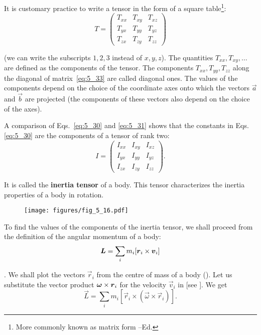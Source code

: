 It is customary practice to write a tensor in the form of a square table\footnote{More commonly known as matrix form --Ed.}:
\begin{equation}\label{eq:5_33}
	T = \begin{pmatrix}
		T_{xx}&T_{xy}&T_{xz}\\
		T_{yx}&T_{yy}&T_{yz}\\
		T_{zx}&T_{zy}&T_{zz}
		\end{pmatrix}
\end{equation}

\noindent
(we can write the subscripts $1, 2, 3$ instead of $x, y, z$). The quantities $T_{xx}, T_{xy}, \ldots$ are defined as the components of the tensor. The components $T_{xx}, T_{yy}, T_{zz}$ along the diagonal of matrix~\eqref{eq:5_33} are called diagonal ones. The values of the components depend on the choice of the coordinate axes onto which the vectors $\vec{a}$ and $\vec{b}$ are projected (the components of these vectors also depend on the choice of the axes).

A comparison of Eqs.~\eqref{eq:5_30} and \eqref{eq:5_31} shows that the constants in Eqs.\eqref{eq:5_30} are the components of a tensor of rank two:
\begin{equation}\label{eq:5_34}
	I = \begin{pmatrix}
		I_{xx}&I_{xy}&I_{xz}\\
		I_{yx}&I_{yy}&I_{yz}\\
		I_{zx}&I_{zy}&I_{zz}
	\end{pmatrix}.
\end{equation}

\noindent
It is called the \textbf{inertia tensor} of a body. This tensor characterizes the inertia properties of a body in rotation.

\begin{figure}[t]
	\begin{center}
		\texttt{[image: figures/fig\_5\_16.pdf]}
		\caption[]{}
		\label{fig:5_16}
	\end{center}
\vspace{-1.0cm}
\end{figure}

To find the values of the components of the inertia tensor, we shall proceed from the definition of the angular momentum of a body:
\begin{equation}\label{eq:5_35}
\boldsymbol{L} = \sum_i m_i [\boldsymbol{r}_{i}\times\boldsymbol{v}_{i}]
\end{equation}

. We shall plot the vectors $\vec{r}_i$ from the centre of mass of a body (). Let us substitute the vector product $\boldsymbol{\omega}\times\boldsymbol{r}_i$ for the velocity $\vec{v}_i$ in  [see ]. We get
\begin{equation*}
\vec{L} = \sum_i m_i [\vec{r}_i \times (\vec{\omega} \times \vec{r}_i)].
\end{equation*}

